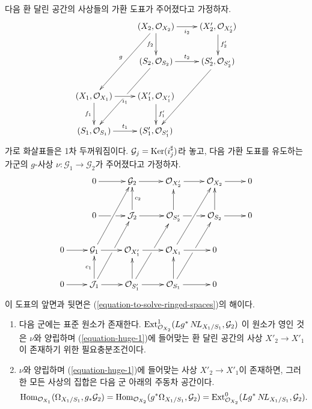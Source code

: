 \begin{lemma}
\label{lemma-huge-diagram-ringed-spaces}
다음 환 달린 공간의 사상들의 가환 도표가 주어졌다고 가정하자.
\begin{equation}
\label{equation-huge-1}
\vcenter{
\xymatrix{
& (X_2, \mathcal{O}_{X_2}) \ar[r]_{i_2} \ar[d]_{f_2} \ar[ddl]_g &
(X'_2, \mathcal{O}_{X'_2}) \ar[d]^{f'_2} \\
& (S_2, \mathcal{O}_{S_2}) \ar[r]^{t_2} \ar[ddl]|\hole &
(S'_2, \mathcal{O}_{S'_2}) \ar[ddl] \\
(X_1, \mathcal{O}_{X_1}) \ar[r]_{i_1} \ar[d]_{f_1} &
(X'_1, \mathcal{O}_{X'_1}) \ar[d]^{f'_1} \\
(S_1, \mathcal{O}_{S_1}) \ar[r]^{t_1} &
(S'_1, \mathcal{O}_{S'_1})
}
}
\end{equation}
가로 화살표들은 1차 두꺼워짐이다. $\mathcal{G}_j = \mathop{\mathrm{Ker}}(i_j^\sharp)$라
놓고, 다음 가환 도표를 유도하는 가군의 $g$-사상
$\nu : \mathcal{G}_1 \to \mathcal{G}_2$가 주어졌다고 가정하자.
\begin{equation}
\label{equation-huge-2}
\vcenter{
\xymatrix{
& 0 \ar[r] & \mathcal{G}_2 \ar[r] &
\mathcal{O}_{X'_2} \ar[r] &
\mathcal{O}_{X_2} \ar[r] & 0 \\
& 0 \ar[r]|\hole &
\mathcal{J}_2 \ar[u]_{c_2} \ar[r] &
\mathcal{O}_{S'_2} \ar[u] \ar[r]|\hole &
\mathcal{O}_{S_2} \ar[u] \ar[r] & 0 \\
0 \ar[r] & \mathcal{G}_1 \ar[ruu] \ar[r] &
\mathcal{O}_{X'_1} \ar[r] &
\mathcal{O}_{X_1} \ar[ruu] \ar[r] & 0 \\
0 \ar[r] & \mathcal{J}_1 \ar[ruu]|\hole \ar[u]^{c_1} \ar[r] &
\mathcal{O}_{S'_1} \ar[ruu]|\hole \ar[u] \ar[r] &
\mathcal{O}_{S_1} \ar[ruu]|\hole \ar[u] \ar[r] & 0
}
}
\end{equation}
이 도표의 앞면과 뒷면은 (\ref{equation-to-solve-ringed-spaces})의
해이다.
\begin{enumerate}
\item 다음 군에는 표준 원소가 존재한다.
$\mathop{\mathrm{Ext}}\nolimits^1_{\mathcal{O}_{X_2}}(Lg^*\mathop{N\!L}\nolimits_{X_1/S_1}, \mathcal{G}_2)$
이 원소가 영인 것은 $\nu$와 양립하며
(\ref{equation-huge-1})에 들어맞는 환 달린 공간의 사상
$X'_2 \to X'_1$이 존재하기 위한 필요충분조건이다.
\item $\nu$와 양립하며 (\ref{equation-huge-1})에 들어맞는 사상
$X'_2 \to X'_1$이 존재하면, 그러한 모든 사상의 집합은 다음 군
아래의 주동차 공간이다.
$$
\mathop{\mathrm{Hom}}\nolimits_{\mathcal{O}_{X_1}}(\Omega_{X_1/S_1}, g_*\mathcal{G}_2) =
\mathop{\mathrm{Hom}}\nolimits_{\mathcal{O}_{X_2}}(g^*\Omega_{X_1/S_1}, \mathcal{G}_2) =
\mathop{\mathrm{Ext}}\nolimits^0_{\mathcal{O}_{X_2}}(Lg^*\mathop{N\!L}\nolimits_{X_1/S_1}, \mathcal{G}_2).
$$
\end{enumerate}
\end{lemma}

